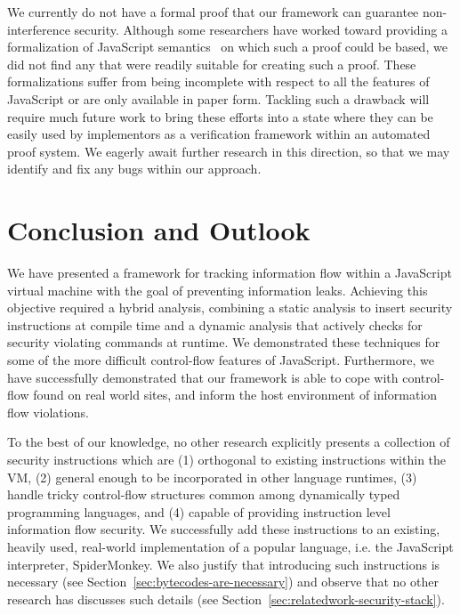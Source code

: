 We currently do not have a formal proof that our framework can guarantee non-interference security.
Although some researchers have worked toward providing a formalization of JavaScript semantics~\cite{yu2007javascript, herman2007status, maffeis2008operational, guha2010essence} on which such a proof could be based, we did not find any that were readily suitable for creating such a proof.
These formalizations suffer from being incomplete with respect to all the features of JavaScript or are only available in paper form.
Tackling such a drawback will require much future work to bring these efforts into a state where they can be easily used by implementors as a verification framework within an automated proof system.
We eagerly await further research in this direction, so that we may identify and fix any bugs within our approach.


\section{Conclusion and Outlook}
\label{sec:conclusion}

We have presented a framework for tracking information flow within a JavaScript virtual machine with the goal of preventing information leaks.
Achieving this objective required a hybrid analysis, combining a static analysis to insert security instructions at compile time and a dynamic analysis that actively checks for security violating commands at runtime.
We demonstrated these techniques for some of the more difficult control-flow features of JavaScript.
Furthermore, we have successfully demonstrated that our framework is able to cope with control-flow found on real world sites, and inform the host environment of information flow violations.

To the best of our knowledge, no other research explicitly presents a collection of security instructions which are (1) orthogonal to existing instructions within the VM, (2) general enough to be incorporated in other language runtimes, (3) handle tricky control-flow structures common among dynamically typed programming languages, and (4) capable of providing instruction level information flow security.
We successfully add these instructions to an existing, heavily used, real-world implementation of a popular language, i.e. the JavaScript interpreter, SpiderMonkey.
We also justify that introducing such instructions is necessary (see Section~\ref{sec:bytecodes-are-necessary}) and observe that no other research has discusses such details (see Section~\ref{sec:relatedwork-security-stack}).

